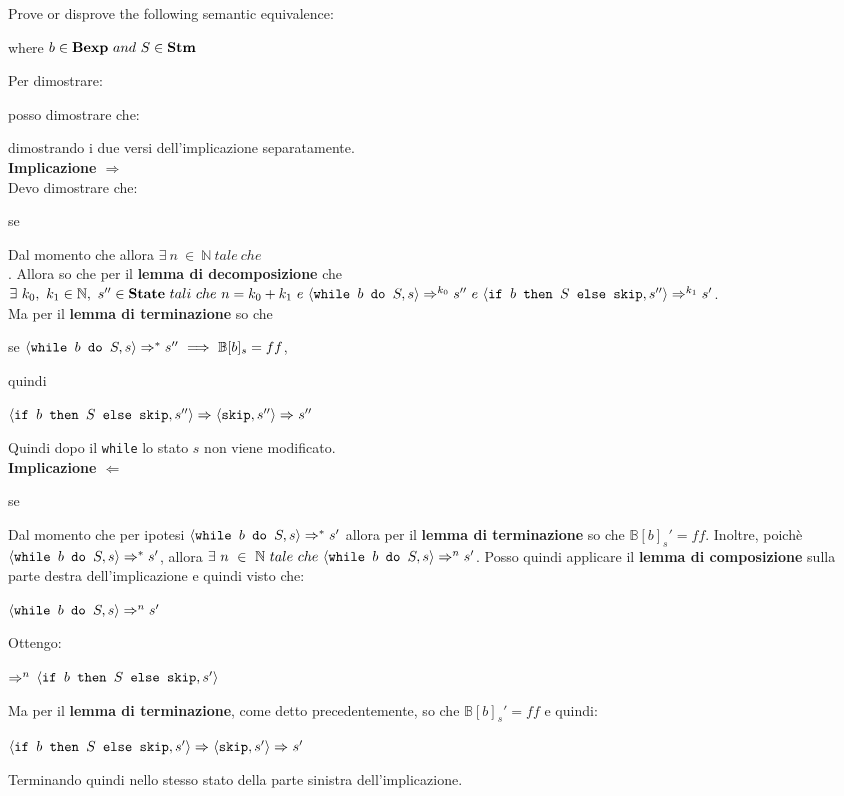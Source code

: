 {
	Prove or disprove the following semantic equivalence:
	\begin{center}
	\exFive{}
	\end{center}
	where $b\in\bexp~and~S\in\stm$
}
{
	Per dimostrare:
	\begin{center}
	\exFive{}
	\end{center}
	posso dimostrare che:
	\begin{center}
	\exFiveIff{}
	\end{center}
	dimostrando i due versi dell'implicazione separatamente.\\

	\textbf{Implicazione $\Longrightarrow{}$}\\
	Devo dimostrare che:
	\begin{center}
	se \exFiveLtR{}
	\end{center}
	Dal momento che \exFiveR{*} allora $\exists~n~\in~\mathbb{N}~tale~che$\\
	. Allora so che per il \textbf{lemma di decomposizione} che 
	$\exists{}~k_0,~k_1\in\mathbb{N},~s''\in\states~tali~che~n=k_0+k_1~e~
	\confSs{\wbS{b}{S}}{s}\Rar{k_0}s''~e~
	\confSs{\ifABC{b}{S}{\skipistr}}{s''}\Rar{k_1}s'$. \\
	Ma per il \textbf{lemma di terminazione} so che 
	\begin{center}
	se $\confSs{\wbS{b}{S}}{s}\Rar{*}s''~\Longrightarrow{}~\mathbb{B}[b]_s=ff$,
	\end{center}
	quindi 
	\begin{center}
	$\confSs{\ifABC{b}{S}{\skipistr}}{s''}\Rar{}
	\confSs{\skipistr}{s''}\Rar{}s''$
	\end{center}
	Quindi dopo il \texttt{while} lo stato $s$ non viene modificato.\\

	\textbf{Implicazione $\Longleftarrow{}$}\\
	\begin{center}
	se \exFiveRtL{}
	\end{center}
	Dal momento che per ipotesi $\confSs{\wbS{b}{S}}{s}\Rar{*}{s'}$ allora
	per il \textbf{lemma di terminazione} so che $\mathbb{B}[b]_s'=ff$.
	Inoltre, poichè $\confSs{\wbS{b}{S}}{s}\Rar{*}{s'}$, allora 
	$\exists~n~\in~\mathbb{N}~tale~che~\confSs{\wbS{b}{S}}{s}\Rar{n}{s'}$.
	Posso quindi applicare il \textbf{lemma di composizione} sulla parte destra
	dell'implicazione e quindi visto che:
	\begin{center}
	$\confSs{\wbS{b}{S}}{s}\Rar{n}{s'}$
	\end{center}
	Ottengo:
	\begin{center}
	$\Rar{n}$
	$\confSs{\ifABC{b}{S}{\skipistr}}{s'}$
	\end{center}
	Ma per il \textbf{lemma di terminazione}, come detto precedentemente, so che
	$\mathbb{B}[b]_s'=ff$ e quindi:
	\begin{center}
	$\confSs{\ifABC{b}{S}{\skipistr}}{s'}\Rar{}\confSs{\skipistr}{s'}\Rar{}s'$
	\end{center}
	Terminando quindi nello stesso stato della parte sinistra dell'implicazione.
}
\newpage
